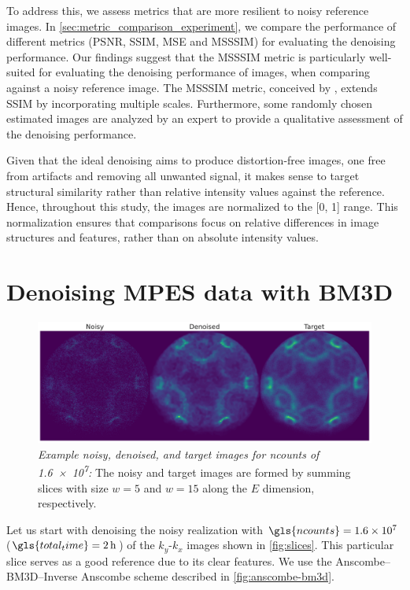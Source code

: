To address this, we assess metrics that are more resilient to noisy reference images. In \cref{sec:metric_comparison_experiment}, we compare the performance of different metrics (\gls{PSNR}, \gls{SSIM}, \gls{MSE} and \gls{MSSSIM}) for evaluating the denoising performance. Our findings suggest that the \gls{MSSSIM} metric is particularly well-suited for evaluating the denoising performance of images, when comparing against a noisy reference image. The \gls{MSSSIM} metric, conceived by \citeauthor{wangMultiscaleStructuralSimilarity2003} \cite{wangMultiscaleStructuralSimilarity2003}, extends SSIM by incorporating multiple scales. Furthermore, some randomly chosen estimated images are analyzed by an expert to provide a qualitative assessment of the denoising performance.

Given that the ideal denoising aims to produce distortion-free images, one free from artifacts and removing all unwanted signal, it makes sense to target structural similarity rather than relative intensity values against the reference. Hence, throughout this study, the images are normalized to the [\num{0}, \num{1}] range. This normalization ensures that comparisons focus on relative differences in image structures and features, rather than on absolute intensity values.

\section{Denoising MPES data with BM3D}\label{sec:mpes-bm3d-denoise}
\begin{figure}
    \centering
    \includegraphics[width=1\linewidth]{images/noisy_denoised_ref_16M_avg_bm3d.pdf}
    \caption{\textit{Example noisy, denoised, and target images for \gls{ncounts} of \num{1.6e7}:} The noisy and target images are formed by summing slices with size $w=5$ and $w=15$ along the $E$ dimension, respectively.}
    \label{fig:noisy-denoised-ref-16M-avg-bm3d}
\end{figure}
Let us start with  denoising the noisy realization with $\gls{ncounts}=\num{1.6e7}$ ($\gls{total_time}=\qty{2}{h}$) of the $k_y$-$k_x$ images shown in \cref{fig:slices}. This particular slice serves as a good reference due to its clear features. We use the Anscombe--\gls{BM3D}--Inverse Anscombe scheme described in \cref{fig:anscombe-bm3d}. 

